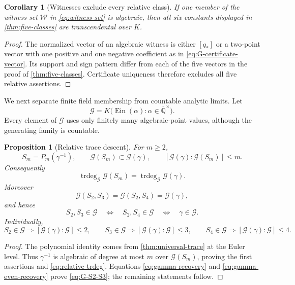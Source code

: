 \documentclass[11pt]{article}
\theoremstyle{keio}
\newtheorem{proposition}[theorem]{Proposition}
\newtheorem{corollary}[theorem]{Corollary}
\theoremstyle{definition}
\theoremstyle{remark}
\newcommand{\Qbar}{\overline{\mathbb Q}}
\newcommand{\Ein}{\operatorname{Ein}}
\newcommand{\trdeg}{\operatorname{trdeg}}
\newcommand{\calG}{\mathcal G}
\begin{document}
\begin{corollary}[Witnesses exclude every relative class]
\label{cor:witness-all-K-trans}
If one member of the witness set \(\mathcal W\) in
\eqref{eq:witness-set} is algebraic, then all six constants displayed in
\cref{thm:five-classes} are transcendental over \(K\).
\end{corollary}

\begin{proof}
The normalized vector of an algebraic witness is either \([q_*]\) or a
two-point vector with one positive and one negative coefficient as in
\eqref{eq:G-certificate-vector}.  Its support and sign pattern differ from
each of the five vectors in the proof of \cref{thm:five-classes}.  Certificate
uniqueness therefore excludes all five relative assertions.
\end{proof}

We next separate finite field membership from countable analytic limits.
Let
\begin{equation}\label{eq:G-field}
 \calG=K\bigl(\Ein(\alpha):\alpha\in\Qbar^\times\bigr).
\end{equation}
Every element of \(\calG\) uses only finitely many algebraic-point values,
although the generating family is countable.

\begin{proposition}[Relative trace descent]
\label{prop:relative-trace-descent}
For \(m\ge2\),
\[
 S_m=P_m(\gamma^{-1}),\qquad
 \calG(S_m)\subset\calG(\gamma),\qquad
 [\calG(\gamma):\calG(S_m)]\le m.
\]
Consequently
\begin{equation}\label{eq:relative-trdeg}
 \trdeg_{\calG}\calG(S_m)=\trdeg_{\calG}\calG(\gamma).
\end{equation}
Moreover
\begin{equation}\label{eq:G-S2-S3}
 \boxed{\calG(S_2,S_3)=\calG(S_2,S_4)=\calG(\gamma)},
\end{equation}
and hence
\begin{equation}\label{eq:joint-gamma-free}
 S_2,S_3\in\calG
 \quad\Longleftrightarrow\quad
 S_2,S_4\in\calG
 \quad\Longleftrightarrow\quad
 \gamma\in\calG.
\end{equation}
Individually,
\[
 S_2\in\calG\Longrightarrow[\calG(\gamma):\calG]\le2,
 \qquad
 S_3\in\calG\Longrightarrow[\calG(\gamma):\calG]\le3,
 \qquad
 S_4\in\calG\Longrightarrow[\calG(\gamma):\calG]\le4.
\]
\end{proposition}

\begin{proof}
The polynomial identity comes from \cref{thm:universal-trace} at the Euler
level.  Thus \(\gamma^{-1}\) is algebraic of degree at most \(m\) over
\(\calG(S_m)\), proving the first assertions and
\eqref{eq:relative-trdeg}.  Equations \eqref{eq:gamma-recovery} and
\eqref{eq:gamma-even-recovery} prove \eqref{eq:G-S2-S3}; the remaining
statements follow.
\end{proof}
\end{document}
